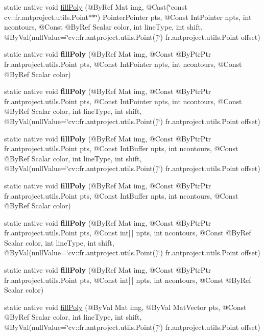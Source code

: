\begin{DoxyCompactItemize}
static native void \hyperlink{group__imgproc__draw_ga885773572ec9b1e9c138b4656851a82a}{fill\+Poly} (@By\+Ref Mat img, @Cast(\char`\"{}const cv\+::\+fr.antproject.utils.Point$\ast$$\ast$\char`\"{}) Pointer\+Pointer pts, @Const Int\+Pointer npts, int ncontours, @Const @By\+Ref Scalar color, int line\+Type, int shift, @By\+Val(null\+Value=\char`\"{}cv\+::\+fr.antproject.utils.Point()\char`\"{}) fr.antproject.utils.Point offset)
\item 
static native void {\bfseries fill\+Poly} (@By\+Ref Mat img, @Const @By\+Ptr\+Ptr fr.antproject.utils.Point pts, @Const Int\+Pointer npts, int ncontours, @Const @By\+Ref Scalar color)
\item 
static native void {\bfseries fill\+Poly} (@By\+Ref Mat img, @Const @By\+Ptr\+Ptr fr.antproject.utils.Point pts, @Const Int\+Pointer npts, int ncontours, @Const @By\+Ref Scalar color, int line\+Type, int shift, @By\+Val(null\+Value=\char`\"{}cv\+::\+fr.antproject.utils.Point()\char`\"{}) fr.antproject.utils.Point offset)
\item 
static native void {\bfseries fill\+Poly} (@By\+Ref Mat img, @Const @By\+Ptr\+Ptr fr.antproject.utils.Point pts, @Const Int\+Buffer npts, int ncontours, @Const @By\+Ref Scalar color, int line\+Type, int shift, @By\+Val(null\+Value=\char`\"{}cv\+::\+fr.antproject.utils.Point()\char`\"{}) fr.antproject.utils.Point offset)
\item 
static native void {\bfseries fill\+Poly} (@By\+Ref Mat img, @Const @By\+Ptr\+Ptr fr.antproject.utils.Point pts, @Const Int\+Buffer npts, int ncontours, @Const @By\+Ref Scalar color)
\item 
static native void {\bfseries fill\+Poly} (@By\+Ref Mat img, @Const @By\+Ptr\+Ptr fr.antproject.utils.Point pts, @Const int\mbox{[}$\,$\mbox{]} npts, int ncontours, @Const @By\+Ref Scalar color, int line\+Type, int shift, @By\+Val(null\+Value=\char`\"{}cv\+::\+fr.antproject.utils.Point()\char`\"{}) fr.antproject.utils.Point offset)
\item 
static native void {\bfseries fill\+Poly} (@By\+Ref Mat img, @Const @By\+Ptr\+Ptr fr.antproject.utils.Point pts, @Const int\mbox{[}$\,$\mbox{]} npts, int ncontours, @Const @By\+Ref Scalar color)
\item 
static native void \hyperlink{group__imgproc__draw_gaf4d0bf95bfbf1d3f0c4742d7486b3982}{fill\+Poly} (@By\+Val Mat img, @By\+Val Mat\+Vector pts, @Const @By\+Ref Scalar color, int line\+Type, int shift, @By\+Val(null\+Value=\char`\"{}cv\+::\+fr.antproject.utils.Point()\char`\"{}) fr.antproject.utils.Point offset)
$$
\end{DoxyCompactItemize}
